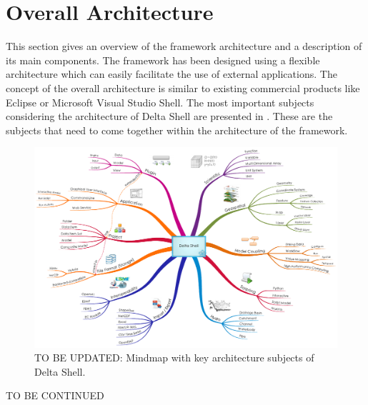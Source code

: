 \section{Overall Architecture}
\label{sec:overallarchitecture}

This section gives an overview of the framework architecture and a description of its main components. The framework has been designed using a flexible architecture which can easily facilitate the use of external applications. The concept of the overall architecture is similar to existing commercial products like Eclipse or Microsoft Visual Studio Shell.
The most important subjects considering the architecture of Delta Shell are presented in . These are the subjects that need to come together within the architecture of the framework.

\begin{figure}[!ht]
\centering
\includegraphics[width=\textwidth]{Figures/Chapter_background/ArchitectureMindMap.pdf}
\caption{TO BE UPDATED: Mindmap with key architecture subjects of Delta Shell.}
\label{Fig:MindMapArch}
\end{figure}


TO BE CONTINUED